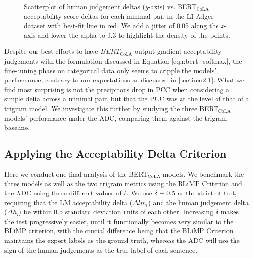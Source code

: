 \begin{figure}[h]
    \caption[Human judgement deltas vs. BERT$_\mathrm{CoLA}$ acceptability \newline score deltas on LI-Adger minimal pairs]{Scatterplot of human judgement deltas (\textit{y}-axis) vs. BERT$_\mathrm{CoLA}$ acceptability score deltas for each minimal pair in the LI-Adger dataset with best-fit line in red.  We add a jitter of 0.05 along the \textit{x}-axis and lower the alpha to 0.3 to highlight the density of the points.}
    \label{fig:bert_acc_delta_correlation_plot}
\end{figure}

Despite our best efforts to have $BERT_{\mathrm{CoLA}}$ output gradient acceptability judgements with the formulation discussed in Equation \ref{eqn:bert_softmax}, the fine-tuning phase on categorical data only seems to cripple the models' performance, contrary to our expectations as discussed in \ref{section:2.1}.  What we find most surprising is not the precipitous drop in PCC when considering a simple delta across a minimal pair, but that the PCC was at the level of that of a trigram model.  We investigate this further by studying the three BERT$_\mathrm{CoLA}$ models' performance under the ADC, comparing them against the trigram baseline.

\subsection{Applying the Acceptability Delta Criterion}
\label{section:2.5.2}
Here we conduct one final analysis of the BERT$_\mathrm{CoLA}$ models.  We benchmark the three models as well as the two trigram metrics using the BLiMP Criterion and the ADC using three different values of $\delta$.  We use $\delta=0.5$ as the strictest test, requiring that the LM acceptability delta ($\Delta lm_i$) and the human judgement delta ($\Delta h_i$) be within 0.5 standard deviation units of each other.  Increasing $\delta$ makes the test progressively easier, until it functionally becomes very similar to the BLiMP criterion, with the crucial difference being that the BLiMP Criterion maintains the expert labels as the ground truth, whereas the ADC will use the sign of the human judgements as the true label of each sentence.

